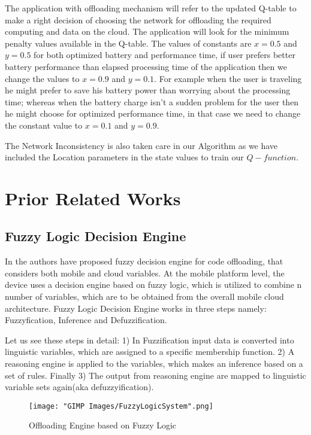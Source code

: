 \documentclass[12pt, twocolumn]{article}
\begin{document}
The application with offloading mechanism will refer to the updated Q-table to make a right decision of choosing the network
for offloading the required computing and data on the cloud. The application will look for the minimum penalty values available in the Q-table. The values of constants are $ x = 0.5 $ and $ y = 0.5 $ for both optimized battery and performance time, if user prefers better battery performance than elapsed processing time of the application then we change the values to $ x = 0.9 $ and $ y = 0.1 $. For example when the user is traveling he might prefer to save his battery power than worrying about the processing time; whereas when the battery charge isn't a sudden problem for the user then he might choose for optimized performance time, in that case we need to change the constant value to $x = 0.1$ and $y = 0.9$.

The Network Inconsistency is also taken care in our Algorithm as we have included the Location parameters in the state values to train our $Q-function$.


\chapter{Prior Related Works}
\section{Fuzzy Logic Decision Engine}

In \cite{flores2013adaptive} the authors have proposed fuzzy decision engine for code offloading, that considers both mobile and cloud variables. At the mobile platform level, the device uses a decision engine based on fuzzy logic, which is utilized to
combine n number of variables, which are to be obtained from the overall mobile cloud architecture. Fuzzy
Logic Decision Engine works in three steps namely: Fuzzyfication, Inference and Defuzzification. 

Let us see these steps in detail:
1) In Fuzzification input data is converted into linguistic variables, which are assigned to a specific
membership function. 2) A reasoning engine is applied to the variables, which makes an inference based on
a set of rules. Finally 3) The output from reasoning engine are mapped to linguistic variable sets again(aka
defuzzyification).
\begin{figure}[h]
  \centering
  \texttt{[image: "GIMP Images/FuzzyLogicSystem".png]}
  \caption{Offloading Engine based on Fuzzy Logic}
  \label{fig:FuzzyLogicSystem}
\end{figure}
\end{document}
